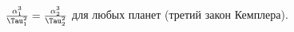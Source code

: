 $\tfrac{\alpha^3_1}{\Tau^2_1}=\tfrac{\alpha^3_2}{\Tau^2_2}$ для любых планет (третий закон Кемплера).